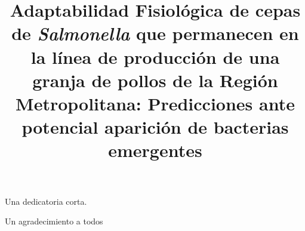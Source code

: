 \documentclass{thesis}
\title{Adaptabilidad Fisiológica de cepas de \emph{Salmonella} que permanecen en la línea de producción de una granja de pollos de la Región Metropolitana: Predicciones ante potencial aparición de bacterias emergentes}
\author %
\begin{document}
\frontmatter
\maketitle

\begin{dedicatoria}
Una dedicatoria corta.
\end{dedicatoria}

\begin{thanks}
Un agradecimiento a todos
\end{thanks}

\tableofcontents
\listoftables
\listoffigures
\listofalgorithms

\mainmatter









\printbibliography
\end{document}
